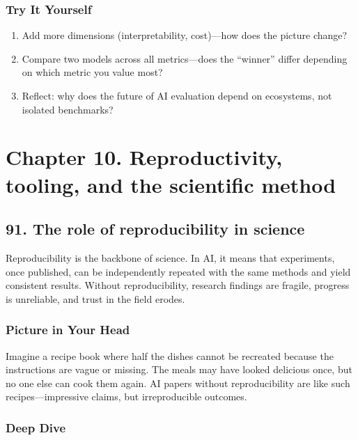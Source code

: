 \documentclass[
  letterpaper,
  DIV=11,
  numbers=noendperiod]{scrreprt}
\providecommand{\tightlist}{%
  \setlength{\itemsep}{0pt}\setlength{\parskip}{0pt}}
\begin{document}
\subsubsection{Try It Yourself}\label{try-it-yourself-89}

\begin{enumerate}
\def\labelenumi{\arabic{enumi}.}
\tightlist
\item
  Add more dimensions (interpretability, cost)---how does the picture
  change?
\item
  Compare two models across all metrics---does the ``winner'' differ
  depending on which metric you value most?
\item
  Reflect: why does the future of AI evaluation depend on ecosystems,
  not isolated benchmarks?
\end{enumerate}

\section{Chapter 10. Reproductivity, tooling, and the scientific
method}\label{chapter-10.-reproductivity-tooling-and-the-scientific-method}

\subsection{91. The role of reproducibility in
science}\label{the-role-of-reproducibility-in-science}

Reproducibility is the backbone of science. In AI, it means that
experiments, once published, can be independently repeated with the same
methods and yield consistent results. Without reproducibility, research
findings are fragile, progress is unreliable, and trust in the field
erodes.

\subsubsection{Picture in Your Head}\label{picture-in-your-head-90}

Imagine a recipe book where half the dishes cannot be recreated because
the instructions are vague or missing. The meals may have looked
delicious once, but no one else can cook them again. AI papers without
reproducibility are like such recipes---impressive claims, but
irreproducible outcomes.

\subsubsection{Deep Dive}\label{deep-dive-90}
\end{document}
